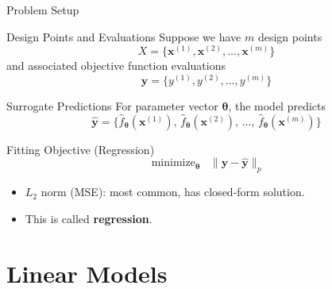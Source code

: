 \documentclass[aspectratio=169,10pt]{beamer}
\newcommand{\vx}{\mathbf{x}}
\newcommand{\vy}{\mathbf{y}}
\newcommand{\btheta}{\boldsymbol{\theta}}
\newcommand{\hatf}{\hat{f}}
\DeclareMathOperator*{\minimize}{minimize}
\begin{document}
\begin{frame}{Problem Setup}
  \begin{block}{Design Points and Evaluations}
    Suppose we have $m$ design points
    \[
      X = \bigl\{\vx^{(1)}, \vx^{(2)}, \ldots, \vx^{(m)}\bigr\}
      \tag{17.1}
    \]
    and associated objective function evaluations
    \[
      \vy = \bigl\{y^{(1)}, y^{(2)}, \ldots, y^{(m)}\bigr\}
      \tag{17.2}
    \]
  \end{block}

  \begin{block}{Surrogate Predictions}
    For parameter vector $\btheta$, the model predicts
    \[
      \hat{\vy} = \bigl\{\hatf_{\btheta}(\vx^{(1)}),\,
                         \hatf_{\btheta}(\vx^{(2)}),\,
                         \ldots,\,
                         \hatf_{\btheta}(\vx^{(m)})\bigr\}
      \tag{17.3}
    \]
  \end{block}

  \begin{block}{Fitting Objective (Regression)}
    \[
      \minimize_{\btheta} \;\; \|\vy - \hat{\vy}\|_p
      \tag{17.4}
    \]
    \begin{itemize}
      \item $L_2$ norm (MSE): most common, has closed-form solution.
      \item This is called \textbf{regression}.
    \end{itemize}
  \end{block}
\end{frame}

\section{Linear Models}
\end{document}
